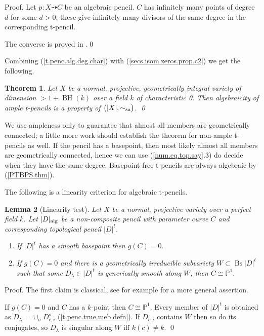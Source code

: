 \documentclass{amsart}
\newtheorem{thm}{Theorem}%
\newtheorem{lem}[thm]{Lemma}
\theoremstyle{definition}
\theoremstyle{remark}
\newcommand{\p}[0]{{\mathbb P}}
\newcommand{\map}[0]{\dasharrow}
\newcommand{\bs}[0]{\operatorname{Bs}}
\newcommand{\BH}[0]{\operatorname{BH}}
\newcommand{\simsa}[0]{\sim_{\rm sa}}
\begin{document}
Proof. Let $p:X\map C$ be an algebraic pencil. 
$C$ has infinitely many points of degree $d$ for some $d>0$,
these give infinitely many divisors of the same degree in the corresponding t-pencil. 

The converse is proved in \cite[5.2.8]{k-lo-2}.\qed
\medskip








Combining (\ref{t.penc.alg.deg.char}) with (\ref{secs.isom.zeros.prop.c2}) we get the following. 


\begin{thm} \label{t.penc.alg.top.prop.thm}
Let  $X$ be a normal, projective, geometrically integral  variety of dimension $>1+\BH(k)$ over a  field $k$ of characteristic 0.  Then algebraicity of ample t-pencils is a property of $\bigl(|X|, \simsa\bigr)$. \qed
\end{thm}

We use ampleness only to guarantee that almost all members are geometrically connected;
 a little more work should establish the theorem  for non-ample t-pencils as well.
If the pencil has a basepoint, then most likely almost all members are
geometrically connected, hence we can use (\ref{num.eq.top.say}.3)  do decide when they have the same degree.
Basepoint-free t-pencils are always algebraic by (\ref{PTBPS.thm}).
\medskip


The following is a linearity criterion for algebraic t-pencils.

\begin{lem}[Linearity test]\label{lin.test.lem}
Let  $X$ be a normal, projective variety over a perfect  field $k$. 
 Let $|D|_{\rm alg}$ be a  non-composite pencil with parameter curve $C$ and corresponding topological pencil $|D|^t$.  
\begin{enumerate}
\item  If  $|D|^t$ has a smooth basepoint then $g(C)=0$.
\item If $g(C)=0$ and there is a geometrically irreducible subvariety  $W\subset \bs |D|^t$ such that some $D_\lambda\in |D|^t$ is generically smooth along $W$, then
$C\cong \p^1$.
\end{enumerate}
\end{lem}

Proof. The first claim is classical,  see for example \cite[VI.1.9]{rc-book} for a more general assertion. 

  If $g(C)=0$ and $C$ has a $k$-point then
$C\cong \p^1$.  Every member of $|D|^t$ is obtained as
$D_\lambda=\cup_{\sigma}  D_{c,i}^\sigma$  (\ref{t.penc.true.meb.defn}). 
If $D_{c,i}$ contains $W$ then so do its conjugates, so
$D_\lambda$ is singular along $W$ iff $k(c)\neq k$.
 \qed
\end{document}
